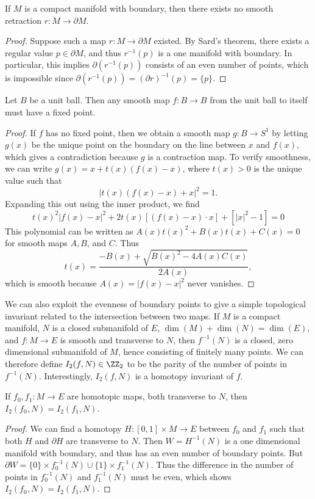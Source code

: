 \begin{theorem}
    If $M$ is a compact manifold with boundary, then there exists no smooth retraction $r: M \to \partial M$.
\end{theorem}
\begin{proof}
    Suppose such a map $r: M \to \partial M$ existed. By Sard's theorem, there exists a regular value $p \in \partial M$, and thus $r^{-1}(p)$ is a one manifold with boundary. In particular, this implies $\partial (r^{-1}(p))$ consists of an even number of points, which is impossible since $\partial (r^{-1}(p)) = (\partial r)^{-1}(p) = \{ p \}$.
\end{proof}

\begin{corollary}[Brouwer]
    Let $B$ be a unit ball. Then any smooth map $f: B \to B$ from the unit ball to itself must have a fixed point.
\end{corollary}
\begin{proof}
    If $f$ has no fixed point, then we obtain a smooth map $g: B \to S^1$ by letting $g(x)$ be the unique point on the boundary on the line between $x$ and $f(x)$, which gives a contradiction because $g$ is a contraction map. To verify smoothness, we can write $g(x) = x + t(x)(f(x) - x)$, where $t(x) > 0$ is the unique value such that
    \[ |t(x)(f(x) - x) + x|^2 = 1. \]
    Expanding this out using the inner product, we find
    \[ t(x)^2 |f(x) - x|^2 + 2t(x)[(f(x) - x) \cdot x] + [|x|^2 - 1] = 0 \]
    This polynomial can be written as $A(x) t(x)^2 + B(x) t(x) + C(x) = 0$ for smooth maps $A,B$, and $C$. Thus
    \[ t(x) = \frac{-B(x) + \sqrt{B(x)^2 - 4A(x)C(x)}}{2A(x)}, \]
    which is smooth because $A(x) = |f(x) - x|^2$ never vanishes.
\end{proof}

We can also exploit the evenness of boundary points to give a simple topological invariant related to the intersection between two maps. If $M$ is a compact manifold, $N$ is a closed submanifold of $E$, $\dim(M) + \dim(N) = \dim(E)$, and $f: M \to E$ is smooth and transverse to $N$, then $f^{-1}(N)$ is a closed, zero dimensional submanifold of $M$, hence consisting of finitely many points. We can therefore define $I_2(f,N) \in \ZZ_2$ to be the parity of the number of points in $f^{-1}(N)$. Interestingly, $I_2(f,N)$ is a homotopy invariant of $f$.    

\begin{theorem}
    If $f_0,f_1: M \to E$ are homotopic maps, both transverse to $N$, then $I_2(f_0,N) = I_2(f_1,N)$.
\end{theorem}
\begin{proof}
    We can find a homotopy $H: [0,1] \times M \to E$ between $f_0$ and $f_1$ such that both $H$ and $\partial H$ are transverse to $N$. Then $W = H^{-1}(N)$ is a one dimensional manifold with boundary, and thus has an even number of boundary points. But $\partial W = \{ 0 \} \times f_0^{-1}(N) \cup \{1 \} \times f_1^{-1}(N)$. Thus the difference in the number of points in $f_0^{-1}(N)$ and $f_1^{-1}(N)$ must be even, which shows $I_2(f_0,N) = I_2(f_1,N)$.
\end{proof}

